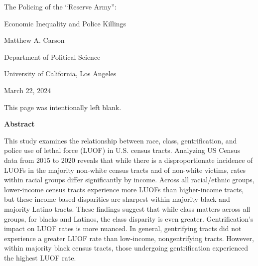 \documentclass[12pt]{article}
\renewcommand{\headrulewidth}{1pt} %
\renewenvironment{abstract}
  {\par\noindent\centering\textbf{Abstract}\par}
  {\noindent\raggedright}
\begin{document}
\begin{titlepage}
  \thispagestyle{fancy}
  \renewcommand{\headrulewidth}{0pt} %
  \centering
  \vspace*{2in}
  The Policing of the ``Reserve Army'':\par
  Economic Inequality and Police Killings\par
  \vspace{1.2in}
  {Matthew A. Carson\par}
  \vspace{12pt}
  Department of Political Science\par
  University of California, Los Angeles\par
  \vspace{0.5in}
  {March 22, 2024\par}
\end{titlepage}

\thispagestyle{empty} %

\vspace*{\fill}
\hspace*{\fill}
\begin{center}
    \noindent{}This page was intentionally left blank.
\end{center}
\hspace*{\fill}
\vspace*{\fill}

\clearpage

\begin{abstract}
This study examines the relationship between race, class, gentrification, and police use of lethal force (LUOF) in U.S. census tracts. Analyzing US Census data from 2015 to 2020 reveals that while there is a disproportionate incidence of LUOFs in the majority non-white census tracts and of non-white victims, rates within racial groups differ significantly by income. Across all racial/ethnic groups, lower-income census tracts experience more LUOFs than higher-income tracts, but these income-based disparities are sharpest within majority black and majority Latino tracts. These findings suggest that while class matters across all groups, for blacks and Latinos, the class disparity is even greater. Gentrification’s impact on LUOF rates is more nuanced. In general, gentrifying tracts did not experience a greater LUOF rate than low-income, nongentrifying tracts. However, within majority black census tracts, those undergoing gentrification experienced the highest LUOF rate.
\end{abstract}
\end{document}
